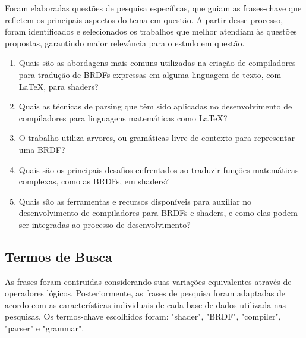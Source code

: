 \documentclass[english, 
               brazil, 
               bsc] %
               {dcomp-abntex2}
\begin{document}
Foram elaboradas questões de pesquisa específicas, que guiam as frases-chave que refletem os principais aspectos do tema em questão. A partir desse processo, foram identificados e selecionados os trabalhos que melhor atendiam às questões propostas, garantindo maior relevância para o estudo em questão.

\begin{enumerate}
  \item Quais são as abordagens mais comuns utilizadas na criação de compiladores para tradução de BRDFs expressas em alguma linguagem de texto, com LaTeX, para shaders?

  \item Quais as técnicas de parsing que têm sido aplicadas no desenvolvimento de compiladores para linguagens matemáticas como LaTeX?

  \item O trabalho utiliza arvores, ou gramáticas livre de contexto para representar uma BRDF?

 \item Quais são os principais desafios enfrentados ao traduzir funções matemáticas complexas, como as BRDFs, em shaders?

 \item Quais são as ferramentas e recursos disponíveis para auxiliar no desenvolvimento de compiladores para BRDFs e shaders, e como elas podem ser integradas ao processo de desenvolvimento?

\end{enumerate}



\subsection{Termos de Busca}
 As frases foram contruidas considerando suas variações equivalentes através de operadores lógicos. Posteriormente, as frases de pesquisa foram adaptadas de acordo com as características individuais de cada base de dados utilizada nas pesquisas. Os termos-chave escolhidos foram: "shader", "BRDF", "compiler", "parser" e "grammar".
\end{document}
